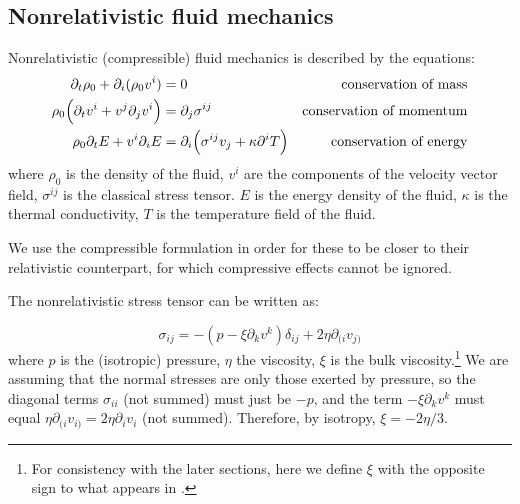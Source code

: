 \documentclass[main.tex]{subfiles}
\begin{document}
\subsection{Nonrelativistic fluid mechanics} \label{sec:nonrelativisti-fluid-mechanics}

Nonrelativistic (compressible) fluid mechanics is described by the equations:
\begin{subequations}
\begin{align}
    \partial_t \rho_0 + \partial_i (\rho_0 v^i) &= 0 &\text{conservation of mass} \label{eq:classical-conservation-mass}\\
    \rho_0 \qty(\partial_t v^i + v^j \partial_j v^i) &= \partial_j \sigma^{ij} &\text{conservation of momentum}  \label{eq:classical-conservation-momentum}\\
    \rho_0 \partial_t E + v^i \partial_i E &= \partial_i \qty(\sigma^{ij}v_j + \kappa\partial^i T) &\text{conservation of energy} \label{eq:classical-conservation-energy}
\end{align}
\end{subequations}
where $\rho_0$ is the density of the fluid,
$v^i$ are the components of the velocity vector field,
$\sigma^{ij}$ is the classical stress tensor. %
$E$ is the energy density of the fluid,
$\kappa$ is the thermal conductivity,
$T$ is the temperature  field of the fluid.

We use the compressible formulation in order for these to be closer to their relativistic counterpart, for which compressive effects cannot be ignored.

The nonrelativistic stress tensor can be written as:

\begin{equation}
    \sigma_{ij} = -(p - \xi \partial_k v^k ) \delta_{ij} + 2 \eta \partial_{(i} v_{j)}
\end{equation}
where $p$ is the (isotropic) pressure, $\eta$ the viscosity, $\xi$ is the bulk viscosity.\footnote{For consistency with the later sections, here we define \(\xi\) with the opposite sign to what appears in \cite[page 301]{Taub:1978}.} We are assuming that the normal stresses are only those exerted by pressure, so the diagonal terms $\sigma_{ii}$ (not summed) must just be $-p$, and the term $-\xi \partial_k v^k$ must equal $\eta \partial_{(i} v_{i)} = 2\eta \partial_i v_i$ (not summed). Therefore, by isotropy, $\xi = -2\eta/3$.
\end{document}
